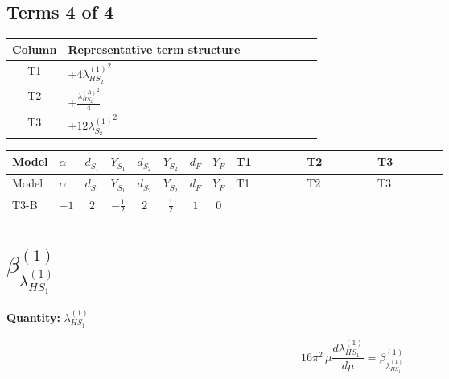 \documentclass[8pt]{article}
\begin{document}
\begin{landscape}
\subsection*{Terms 4 of 4}
\begin{center}
\begin{tabular}{@{}c >{\raggedright\arraybackslash}p{0.82\linewidth}@{}}
\toprule
Column & Representative term structure \\
\midrule
T1 & \(\displaystyle +4 {\lambda_{HS_2}^{(1)}}^2\) \\
\midrule
T2 & \(\displaystyle +\frac{{\lambda_{HS_2}^{(A)}}^2}{4}\) \\
\midrule
T3 & \(\displaystyle +12 {\lambda_{S_2}^{(1)}}^2\) \\
\midrule
\bottomrule
\end{tabular}
\end{center}
\smallskip
\tiny
\begin{longtable}{@{}llcccccc >{\raggedright\arraybackslash}p{0.21\linewidth} >{\raggedright\arraybackslash}p{0.21\linewidth} >{\raggedright\arraybackslash}p{0.21\linewidth}@{}}
\toprule
Model & $\alpha$ & $d_{S_1}$ & $Y_{S_1}$ & $d_{S_2}$ & $Y_{S_2}$ & $d_F$ & $Y_F$ & T1 & T2 & T3 \\
\midrule
\endfirsthead
\toprule
Model & $\alpha$ & $d_{S_1}$ & $Y_{S_1}$ & $d_{S_2}$ & $Y_{S_2}$ & $d_F$ & $Y_F$ & T1 & T2 & T3 \\
\midrule
\endhead
T3-B & $-1$ & $2$ & $-\frac{1}{2}$ & $2$ & $\frac{1}{2}$ & $1$ & $0$ & \scriptsize\adjustbox{max width=\linewidth}{$\begin{gathered} +4 {\lambda_{HS_2}^{(1)}}^2\end{gathered}$} & \scriptsize\adjustbox{max width=\linewidth}{$\begin{gathered} +\frac{{\lambda_{HS_2}^{(A)}}^2}{4}\end{gathered}$} & \scriptsize\adjustbox{max width=\linewidth}{$\begin{gathered} +12 {\lambda_{S_2}^{(1)}}^2\end{gathered}$} \\
\midrule
\bottomrule
\end{longtable}
\clearpage
\section*{$\beta_{\lambda_{HS_1}^{(1)}}^{(1)}$}
\noindent\textbf{Quantity: }$\lambda_{HS_1}^{(1)}$\par\smallskip
\[16\pi^2\,\mu\frac{d \lambda_{HS_1}^{(1)}}{d\mu}=\beta_{\lambda_{HS_1}^{(1)}}^{(1)}\]

\end{landscape}
\end{document}
